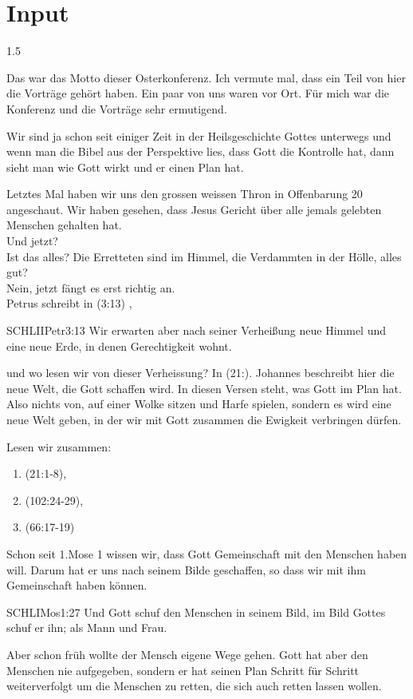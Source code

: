 \documentclass[fontsize=14pt]{../../inc/mybib}
\begin{document}
\section{ Input }
\begin{spacing}{1.5}
    \begin{block}
        Das war das Motto dieser Osterkonferenz. Ich vermute mal, dass ein Teil von hier die Vorträge gehört haben. Ein paar von uns waren vor Ort. Für mich war die Konferenz und die Vorträge sehr ermutigend.

        Wir sind ja schon seit einiger Zeit in der Heilsgeschichte Gottes unterwegs und wenn man die Bibel aus der Perspektive lies, dass Gott die Kontrolle hat, dann sieht man wie Gott wirkt und er einen Plan hat.

        Letztes Mal haben wir uns den grossen weissen Thron in Offenbarung 20 angeschaut. Wir haben gesehen, dass Jesus Gericht über alle jemals gelebten Menschen gehalten hat. 
        \\ Und jetzt? 
        \\ Ist das alles? Die Erretteten sind im Himmel, die Verdammten in der Hölle, alles gut? \\ Nein, jetzt fängt es erst richtig an.\\
        Petrus schreibt in (3:13) , 
        \begin{bibelbox}{SCHL}{IIPetr}{3:13}
            Wir erwarten aber nach seiner Verheißung neue Himmel und eine neue Erde, in denen Gerechtigkeit wohnt.
        \end{bibelbox}
        und wo lesen wir von dieser Verheissung? In (21:). Johannes beschreibt hier die neue Welt, die Gott schaffen wird. In diesen Versen steht, was Gott im Plan hat. Also nichts von, \flqq auf einer Wolke sitzen und Harfe spielen,\frqq{} sondern es wird eine neue Welt geben, in der wir mit Gott zusammen die Ewigkeit verbringen dürfen. 
        
        Lesen wir zusammen: 
        \begin{enumerate}
            \item {}(21:1-8),
            \item {}(102:24-29),
            \item {}(66:17-19)
        \end{enumerate}     
        Schon seit 1.Mose 1 wissen wir, dass Gott Gemeinschaft mit den Menschen haben will. Darum hat er uns nach seinem Bilde geschaffen, so dass wir mit ihm Gemeinschaft haben können.
        \begin{bibelbox}{SCHL}{IMos}{1:27}
            Und Gott schuf den Menschen in seinem Bild, im Bild Gottes schuf er ihn; als Mann und Frau.
        \end{bibelbox}
        Aber schon früh wollte der Mensch eigene Wege gehen. Gott hat aber den Menschen nie aufgegeben, sondern er hat seinen Plan Schritt für Schritt weiterverfolgt um die Menschen zu retten, die sich auch retten lassen wollen. 


\end{block}
\end{spacing}
\end{document}
